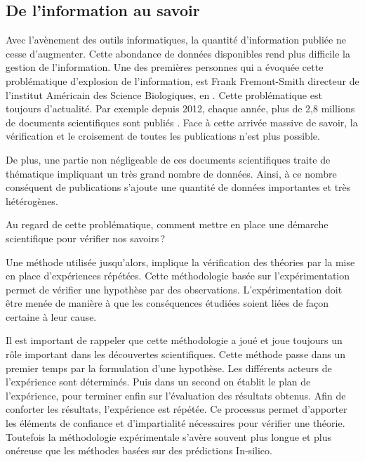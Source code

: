 \begin{refsegment}
\chapter*{De l'information au savoir}
Avec l'avènement des outils informatiques, la quantité d'information publiée ne cesse d'augmenter. Cette abondance de données disponibles rend plus difficile la gestion de l'information. Une des premières personnes qui a évoquée cette problématique d'explosion de l'information, est Frank Fremont-Smith directeur de l'institut Américain des Science Biologiques,  en \citeyear{fremont61}  \cite{fremont61}. Cette problématique est toujours d'actualité. Par exemple depuis 2012, chaque année, plus de 2,8 millions de documents scientifiques sont publiés  \cite{oecd2016} . Face à cette arrivée massive de savoir, la vérification et le croisement de toutes les publications n'est plus possible.

De plus, une partie non négligeable de ces documents scientifiques traite de thématique impliquant un très grand nombre de données. Ainsi, à ce nombre conséquent de publications s'ajoute une quantité de données importantes et très hétérogènes.

Au regard de cette problématique, comment mettre en place une démarche scientifique pour vérifier nos savoirs ?

Une méthode utilisée jusqu'alors, implique la vérification des théories par la mise en place d'expériences répétées. Cette méthodologie basée sur l'expérimentation permet de vérifier une hypothèse par des observations. L'expérimentation doit être menée de manière à que les conséquences étudiées soient liées de façon certaine à leur cause.

Il est important de rappeler que cette méthodologie a joué et joue toujours un rôle important dans les découvertes scientifiques. Cette méthode passe dans un premier temps par la formulation d'une hypothèse. Les différents acteurs de l'expérience sont déterminés. Puis dans un second on établit le plan de l'expérience, pour terminer enfin sur l'évaluation des résultats obtenus. Afin de conforter les résultats, l'expérience est répétée. Ce processus permet d'apporter les éléments de confiance et d'impartialité nécessaires pour vérifier une théorie. Toutefois la méthodologie expérimentale s'avère souvent plus longue et plus onéreuse que les méthodes basées sur des prédictions In-silico. 


\end{refsegment}
